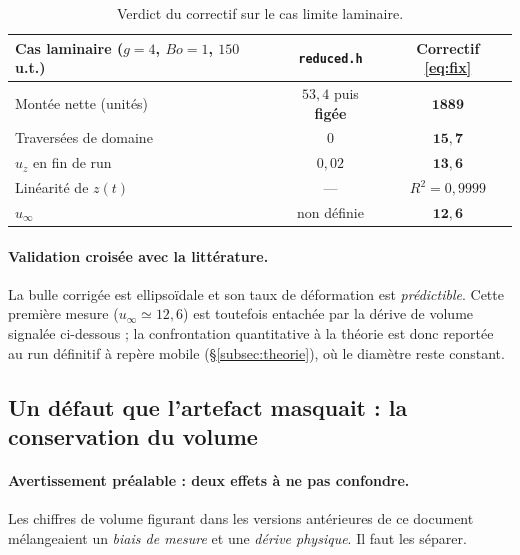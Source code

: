 \begin{table}[htbp]
    \centering
    \renewcommand{\arraystretch}{1.3}
    \begin{tabular}{lcc}
        \toprule
        Cas laminaire ($g=4$, $Bo=1$, $150$ u.t.) & \texttt{reduced.h} & Correctif \eqref{eq:fix} \\
        \midrule
        Montée nette (unités) & $53{,}4$ puis \textbf{figée} & $\mathbf{1889}$ \\
        Traversées de domaine & $0$ & $\mathbf{15{,}7}$ \\
        $u_z$ en fin de run & $0{,}02$ & $\mathbf{13{,}6}$ \\
        Linéarité de $z(t)$ & --- & $R^2 = 0{,}9999$ \\
        $u_\infty$ & non définie & $\mathbf{12{,}6}$ \\
        \bottomrule
    \end{tabular}
    \caption{Verdict du correctif sur le cas limite laminaire.}
    \label{tab:fix_verdict}
\end{table}

\paragraph{Validation croisée avec la littérature.} La bulle corrigée est
ellipsoïdale et son taux de déformation est \emph{prédictible}. Cette première
mesure ($u_\infty\simeq12{,}6$) est toutefois entachée par la dérive de volume
signalée ci-dessous ; la confrontation quantitative à la théorie est donc reportée
au run définitif à repère mobile (§\ref{subsec:theorie}), où le diamètre reste
constant.

\subsection{Un défaut que l'artefact masquait : la conservation du volume}
\label{subsec:biais_volume}

\paragraph{Avertissement préalable : deux effets à ne pas confondre.} Les chiffres
de volume figurant dans les versions antérieures de ce document mélangeaient un
\emph{biais de mesure} et une \emph{dérive physique}. Il faut les séparer.


